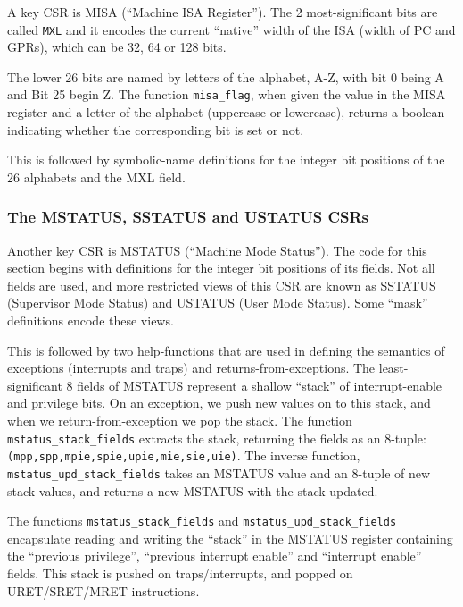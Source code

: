\documentclass[11pt]{article}
\begin{document}
A key CSR is MISA (``Machine ISA Register'').  The 2 most-significant
bits are called \verb|MXL| and it encodes the current ``native'' width
of the ISA (width of PC and GPRs), which can be 32, 64 or 128 bits.



The lower 26 bits are named by letters of the alphabet, A-Z, with bit
0 being A and Bit 25 begin Z.  The function \verb|misa_flag|, when
given the value in the MISA register and a letter of the alphabet
(uppercase or lowercase), returns a boolean indicating whether the
corresponding bit is set or not.



This is followed by symbolic-name definitions for the integer bit
positions of the 26 alphabets and the MXL field.




\subsubsection{The MSTATUS, SSTATUS and USTATUS CSRs}

Another key CSR is MSTATUS (``Machine Mode Status'').  The code for
this section begins with definitions for the integer bit positions of
its fields.  Not all fields are used, and more restricted views of
this CSR are known as SSTATUS (Supervisor Mode Status) and USTATUS
(User Mode Status).  Some ``mask'' definitions encode these views.

This is followed by two help-functions that are used in defining the
semantics of exceptions (interrupts and traps) and
returns-from-exceptions.  The least-significant 8 fields of MSTATUS
represent a shallow ``stack'' of interrupt-enable and privilege
bits. On an exception, we push new values on to this stack, and when
we return-from-exception we pop the stack. The function
\verb|mstatus_stack_fields| extracts the stack, returning the fields
as an 8-tuple: \verb|(mpp,spp,mpie,spie,upie,mie,sie,uie)|.  The
inverse function, \verb|mstatus_upd_stack_fields| takes an MSTATUS
value and an 8-tuple of new stack values, and returns a new MSTATUS
with the stack updated.

The functions \verb|mstatus_stack_fields| and
\verb|mstatus_upd_stack_fields| encapsulate reading and writing the
``stack'' in the MSTATUS register containing the ``previous
privilege'', ``previous interrupt enable'' and ``interrupt enable''
fields.  This stack is pushed on traps/interrupts, and popped on
URET/SRET/MRET instructions.
\end{document}
